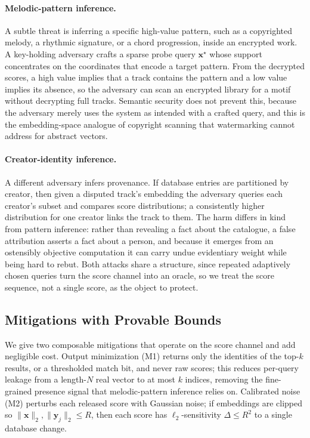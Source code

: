 \documentclass[sigconf,nonacm]{acmart}
\begin{document}
\paragraph{Melodic-pattern inference.}
A subtle threat is inferring a specific high-value pattern, such as a copyrighted melody, a rhythmic signature, or a chord progression, inside an encrypted work. A key-holding adversary crafts a sparse probe query $\mathbf{x}^{\star}$ whose support concentrates on the coordinates that encode a target pattern. From the decrypted scores, a high value implies that a track contains the pattern and a low value implies its absence, so the adversary can scan an encrypted library for a motif without decrypting full tracks. Semantic security does not prevent this, because the adversary merely uses the system as intended with a crafted query, and this is the embedding-space analogue of copyright scanning that watermarking cannot address for abstract vectors.

\paragraph{Creator-identity inference.}
A different adversary infers provenance. If database entries are partitioned by creator, then given a disputed track's embedding the adversary queries each creator's subset and compares score distributions; a consistently higher distribution for one creator links the track to them. The harm differs in kind from pattern inference: rather than revealing a fact about the catalogue, a false attribution asserts a fact about a person, and because it emerges from an ostensibly objective computation it can carry undue evidentiary weight while being hard to rebut. Both attacks share a structure, since repeated adaptively chosen queries turn the score channel into an oracle, so we treat the score sequence, not a single score, as the object to protect.

\subsection{Mitigations with Provable Bounds}
\label{subsec:mitigations}
We give two composable mitigations that operate on the score channel and add negligible cost. Output minimization (M1) returns only the identities of the top-$k$ results, or a thresholded match bit, and never raw scores; this reduces per-query leakage from a length-$N$ real vector to at most $k$ indices, removing the fine-grained presence signal that melodic-pattern inference relies on. Calibrated noise (M2) perturbs each released score with Gaussian noise; if embeddings are clipped so $\lVert\mathbf{x}\rVert_2,\lVert\mathbf{y}_j\rVert_2\le R$, then each score has $\ell_2$-sensitivity $\Delta\le R^2$ to a single database change.
\end{document}
